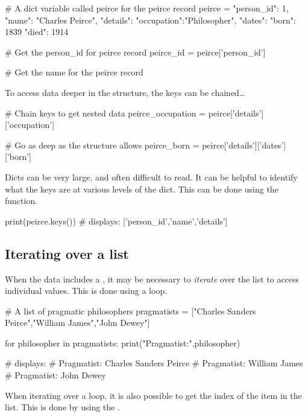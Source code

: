 \begin{pycode}
    # A dict variable called peirce for the peirce record
    peirce = {
        "person_id": 1,
        "name": "Charles Peirce",
        "details": {
            "occupation":"Philosopher",
            "dates": {
                "born": 1839
                "died": 1914
            }
        }
    }

    # Get the person_id for peirce record
    peirce_id = peirce['person_id']

    # Get the name for the peirce record
\end{pycode}

To access data deeper in the structure, the keys can be chained\dots

\begin{pycode}
    # Chain keys to get nested data
    peirce_occupation = peirce['details']['occupation']

    # Go as deep as the structure allows
    peirce_born = peirce['details']['dates']['born']
\end{pycode}

Dicts can be very large, and often difficult to read. It can be helpful to identify what the keys are at various levels of the dict. This can be done using the  function.

\begin{pycode}
    print(peirce.keys())
    # displays: ['person_id','name','details']
\end{pycode}

\subsection{Iterating over a list}

When the data includes a , it may be necessary to \textit{iterate} over the list to access individual values. This is done using a  loop.

\begin{pycode}
    # A list of pragmatic philosophers
    pragmatists = ["Charles Sanders Peirce","William James","John Dewey"]

    for philosopher in pragmatists:
        print("Pragmatist:",philosopher)

    # displays:
    # Pragmatist: Charles Sanders Peirce
    # Pragmatist: William James
    # Pragmatist: John Dewey
\end{pycode}

When iterating over a loop, it is also possible to get the index of the item in the list. This is done by using the .

